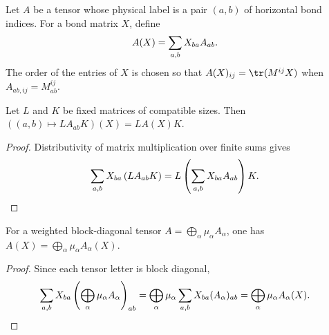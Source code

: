 \begin{definition}
    \label{def:mpdo_vertical_bond_matrix_contraction}
    \leanok
    Let $A$ be a tensor whose physical label is a pair $(a,b)$ of horizontal
    bond indices. For a bond matrix $X$, define
    \begin{align}
        A(X) & =\sum_{a,b}X_{ba}A_{ab}.
        \notag
    \end{align}
    The order of the entries of $X$ is chosen so that
    $A(X)_{ij}=\tr(M^{ij}X)$ when
    $A_{ab,ij}=M^{ij}_{ab}$.
\end{definition}

\begin{lemma}
    \label{lem:mpdo_bond_contraction_composition}
    \leanok
    Let $L$ and $K$ be fixed matrices of compatible sizes. Then
    $\left((a,b)\mapsto L A_{ab}K\right)(X)=L A(X)K$.
\end{lemma}

\begin{proof}\leanok
    Distributivity of matrix multiplication over finite sums gives
    \begin{align}
        \sum_{a,b}X_{ba}\left(LA_{ab}K\right)
         & =L\left(\sum_{a,b}X_{ba}A_{ab}\right)K.
        \notag
    \end{align}
\end{proof}

\begin{lemma}
    \label{lem:mpdo_bond_contraction_block_sum}
    \leanok
    For a weighted block-diagonal tensor
    $A=\bigoplus_\alpha\mu_\alpha A_\alpha$, one has
    $A(X)=\bigoplus_\alpha\mu_\alpha A_\alpha(X)$.
\end{lemma}

\begin{proof}\leanok
    Since each tensor letter is block diagonal,
    \begin{align}
        \sum_{a,b}X_{ba}
        \left(\bigoplus_\alpha\mu_\alpha A_\alpha\right)_{ab}
         & =\bigoplus_\alpha\mu_\alpha
        \sum_{a,b}X_{ba}(A_\alpha)_{ab}
        =\bigoplus_\alpha\mu_\alpha A_\alpha(X).
        \notag
    \end{align}
\end{proof}

